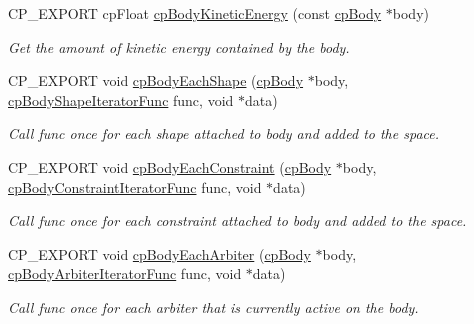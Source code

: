 \begin{DoxyCompactItemize}
\mbox{\label{group__cpBody_ga97f83b89ca7faa47a4862aa1eade34cc}} 
C\+P\+\_\+\+E\+X\+P\+O\+RT cp\+Float \hyperlink{group__cpBody_ga97f83b89ca7faa47a4862aa1eade34cc}{cp\+Body\+Kinetic\+Energy} (const \hyperlink{structcpBody}{cp\+Body} $\ast$body)
\begin{DoxyCompactList}\small\item\em Get the amount of kinetic energy contained by the body. \end{DoxyCompactList}\item 
\mbox{\label{group__cpBody_ga4c8ab091fe6f38b6d55192170a031bf3}} 
C\+P\+\_\+\+E\+X\+P\+O\+RT void \hyperlink{group__cpBody_ga4c8ab091fe6f38b6d55192170a031bf3}{cp\+Body\+Each\+Shape} (\hyperlink{structcpBody}{cp\+Body} $\ast$body, \hyperlink{group__cpBody_gacc4f466cbeaa87fc8b05c0357e1e316d}{cp\+Body\+Shape\+Iterator\+Func} func, void $\ast$data)
\begin{DoxyCompactList}\small\item\em Call {\ttfamily func} once for each shape attached to {\ttfamily body} and added to the space. \end{DoxyCompactList}\item 
\mbox{\label{group__cpBody_gae497b4998a3379fa232bf4623114010d}} 
C\+P\+\_\+\+E\+X\+P\+O\+RT void \hyperlink{group__cpBody_gae497b4998a3379fa232bf4623114010d}{cp\+Body\+Each\+Constraint} (\hyperlink{structcpBody}{cp\+Body} $\ast$body, \hyperlink{group__cpBody_ga8cacab9a606b0dbb1dad405bb0d7ba12}{cp\+Body\+Constraint\+Iterator\+Func} func, void $\ast$data)
\begin{DoxyCompactList}\small\item\em Call {\ttfamily func} once for each constraint attached to {\ttfamily body} and added to the space. \end{DoxyCompactList}\item 
\mbox{\label{group__cpBody_ga1946a82f1a256333fae25c818a68b3ab}} 
C\+P\+\_\+\+E\+X\+P\+O\+RT void \hyperlink{group__cpBody_ga1946a82f1a256333fae25c818a68b3ab}{cp\+Body\+Each\+Arbiter} (\hyperlink{structcpBody}{cp\+Body} $\ast$body, \hyperlink{group__cpBody_gac655e03d7b2d7fd0a870a702f9de0026}{cp\+Body\+Arbiter\+Iterator\+Func} func, void $\ast$data)
\begin{DoxyCompactList}\small\item\em Call {\ttfamily func} once for each arbiter that is currently active on the body. \end{DoxyCompactList}\end{DoxyCompactItemize}


